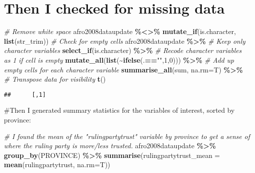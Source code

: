 \documentclass[]{article}
\newenvironment{Shaded}{\begin{snugshade}}{\end{snugshade}}
\newcommand{\CommentTok}[1]{\textcolor[rgb]{0.56,0.35,0.01}{\textit{#1}}}
\newcommand{\DataTypeTok}[1]{\textcolor[rgb]{0.13,0.29,0.53}{#1}}
\newcommand{\DecValTok}[1]{\textcolor[rgb]{0.00,0.00,0.81}{#1}}
\newcommand{\KeywordTok}[1]{\textcolor[rgb]{0.13,0.29,0.53}{\textbf{#1}}}
\newcommand{\NormalTok}[1]{#1}
\newcommand{\OperatorTok}[1]{\textcolor[rgb]{0.81,0.36,0.00}{\textbf{#1}}}
\newcommand{\StringTok}[1]{\textcolor[rgb]{0.31,0.60,0.02}{#1}}
\begin{document}
\hypertarget{then-i-checked-for-missing-data}{%
\section{Then I checked for missing
data}\label{then-i-checked-for-missing-data}}

\begin{Shaded}
\begin{Highlighting}[]
\CommentTok{\# Remove white space}
\NormalTok{afro2008dataupdate }\OperatorTok{\%<>\%}
\StringTok{  }\KeywordTok{mutate\_if}\NormalTok{(is.character, }\KeywordTok{list}\NormalTok{(str\_trim))}
\CommentTok{\# Check for empty cells}
\NormalTok{afro2008dataupdate }\OperatorTok{\%>\%}
\StringTok{  }\CommentTok{\# Keep only character variables }
\StringTok{  }\KeywordTok{select\_if}\NormalTok{(is.character) }\OperatorTok{\%>\%}
\StringTok{  }\CommentTok{\# Recode character variables as 1 if cell is empty }
\StringTok{  }\KeywordTok{mutate\_all}\NormalTok{(}\KeywordTok{list}\NormalTok{(}\OperatorTok{\textasciitilde{}}\KeywordTok{ifelse}\NormalTok{(.}\OperatorTok{==}\StringTok{""}\NormalTok{,}\DecValTok{1}\NormalTok{,}\DecValTok{0}\NormalTok{))) }\OperatorTok{\%>\%}
\StringTok{  }\CommentTok{\# Add up empty cells for each character variable }
\StringTok{  }\KeywordTok{summarise\_all}\NormalTok{(sum, }\DataTypeTok{na.rm=}\NormalTok{T) }\OperatorTok{\%>\%}
\StringTok{  }\CommentTok{\# Transpose data for visibility }
\StringTok{  }\KeywordTok{t}\NormalTok{()}
\end{Highlighting}
\end{Shaded}

\begin{verbatim}
##      [,1]
\end{verbatim}

\#Then I generated summary statistics for the variables of interest,
sorted by province:

\begin{Shaded}
\begin{Highlighting}[]
\CommentTok{\# I found the mean of the "rulingpartytrust" variable by province to get a sense of where the ruling party is more/less trusted.}
\NormalTok{afro2008dataupdate }\OperatorTok{\%>\%}
\StringTok{  }\KeywordTok{group\_by}\NormalTok{(PROVINCE) }\OperatorTok{\%>\%}
\StringTok{  }\KeywordTok{summarise}\NormalTok{(}\DataTypeTok{rulingpartytrust\_mean =} \KeywordTok{mean}\NormalTok{(rulingpartytrust, }\DataTypeTok{na.rm=}\NormalTok{T))}
\end{Highlighting}
\end{Shaded}
\end{document}
